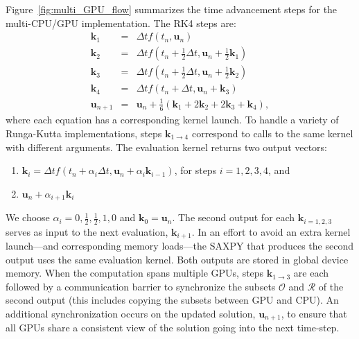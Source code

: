 \documentclass{report}
\begin{document}
Figure~\ref{fig:multi_GPU_flow} summarizes the time advancement steps for the multi-CPU/GPU implementation. The RK4 steps are: 
\begin{eqnarray} 
\mathbf{k}_1 &=& \Delta t f(t_n, \mathbf{u}_n) \nonumber \\
\mathbf{k}_2 &=& \Delta t f(t_n+\frac{1}{2}\Delta t, \mathbf{u}_n + \frac{1}{2}\mathbf{k}_1) \nonumber \\
\mathbf{k}_3 &=& \Delta t f(t_n+\frac{1}{2}\Delta t, \mathbf{u}_n + \frac{1}{2}\mathbf{k}_2)  \label{eqn:rk4}\\
\mathbf{k}_4 &=& \Delta t f(t_n+\Delta t, \mathbf{u}_n + \mathbf{k}_3) \nonumber \\
\mathbf{u}_{n+1} &=& \mathbf{u}_{n} + \frac{1}{6}(\mathbf{k}_1 + 2\mathbf{k}_2 + 2\mathbf{k}_3 +\mathbf{k}_4), \nonumber
\end{eqnarray}
where each equation has a corresponding kernel launch. To handle a variety of Runga-Kutta implementations, steps $\mathbf{k}_{1\rightarrow4}$ correspond to calls to the same kernel with different arguments. The evaluation kernel returns two output vectors: 
\begin{enumerate} 
\item $\mathbf{k}_i = \Delta t f(t_n + \alpha_{i} \Delta t, \mathbf{u}_n + \alpha_{i} \mathbf{k}_{i-1})$, for steps $i=1,2,3,4$, and
\item  $\mathbf{u}_n + \alpha_{i+1} \mathbf{k}_i$
\end{enumerate} 
We choose $\alpha_{i}=0, \frac{1}{2}, \frac{1}{2}, 1, 0$ and $\mathbf{k}_{0} = \mathbf{u}_n$. The second output for each $\mathbf{k}_{i=1,2,3}$ serves as input to the next evaluation, $\mathbf{k}_{i+1}$. In an effort to avoid an extra kernel launch---and corresponding memory loads---the SAXPY that produces the second output uses the same evaluation kernel. Both outputs are stored in global device memory. When the computation spans multiple GPUs, steps $\mathbf{k}_{1\rightarrow3}$ are each followed by a communication barrier to synchronize the subsets $\mathcal{O}$ and $\mathcal{R}$ of the second output (this includes copying the subsets between GPU and CPU). An additional synchronization occurs on the updated solution, $\mathbf{u}_{n+1}$, to ensure that all GPUs share a consistent view of the solution going into the next time-step.
\end{document}
